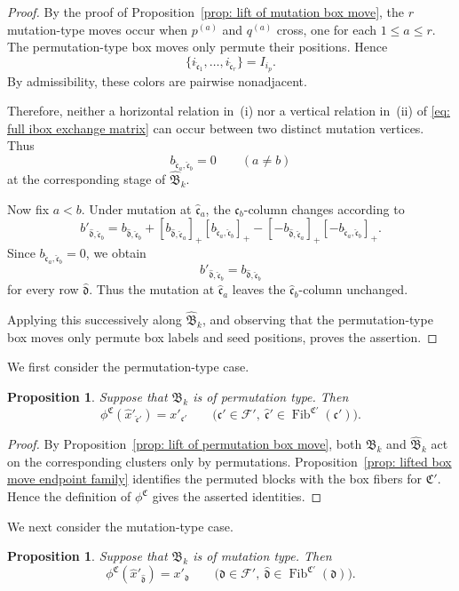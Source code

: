\documentclass[12pt, leqno]{amsart}
\numberwithin{equation}{section}
\theoremstyle{plain}
\newtheorem{proposition}[lemma]{Proposition}
\theoremstyle{definition}
\newcommand{\Fib}{\operatorname{Fib}}
\newcommand{\hx}{\widehat{x}}
\newcommand{\frakB}{\mathfrak{B}}
\newcommand{\frakC}{\mathfrak{C}}
\newcommand{\frakc}{\mathfrak{c}}
\newcommand{\frakd}{\mathfrak{d}}
\newcommand{\hfrakc}{\widehat{\frakc}}
\newcommand{\hfrakd}{\widehat{\frakd}}
\newcommand{\calF}{\mathcal{F}}
\newcommand{\hfrakB}{\widehat{\frakB}}
\begin{document}
\begin{proof}
By the proof of Proposition~\ref{prop: lift of mutation box move},
the $r$ mutation-type moves occur when $p^{(a)}$ and $q^{(a)}$
cross, one for each $1\leq a\leq r$. The permutation-type box moves
only permute their positions. Hence
\[
\{i_{\hfrakc_1},\ldots,i_{\hfrakc_r}\}=I_{i_p}.
\]
By admissibility, these colors are pairwise nonadjacent.

Therefore, neither a horizontal relation in~{\rm (i)} nor a vertical
relation in~{\rm (ii)} of
\eqref{eq: full ibox exchange matrix} can occur between two distinct
mutation vertices. Thus
\[
b_{\hfrakc_a,\hfrakc_b}=0 \qquad(a\ne b)
\]
 at the corresponding stage of $\hfrakB_k$.

Now fix $a<b$. Under mutation at $\hfrakc_a$, the
$\hfrakc_b$-column changes according to
\[
b'_{\hfrakd,\hfrakc_b}
= b_{\hfrakd,\hfrakc_b} + [b_{\hfrakd,\hfrakc_a}]_+ [b_{\hfrakc_a,\hfrakc_b}]_+ - [-b_{\hfrakd,\hfrakc_a}]_+ [-b_{\hfrakc_a,\hfrakc_b}]_+.
\]
Since $b_{\hfrakc_a,\hfrakc_b}=0$,
we obtain
\[
b'_{\hfrakd,\hfrakc_b} = b_{\hfrakd,\hfrakc_b}
\]
for every row $\hfrakd$. Thus the mutation at $\hfrakc_a$ leaves the
$\hfrakc_b$-column unchanged.

Applying this successively along $\hfrakB_k$, and observing that the
permutation-type box moves only permute box labels and
seed positions, proves the assertion.
\end{proof}

We first consider the permutation-type case.

\begin{proposition}\label{prop: permutation ibox cluster folding}
Suppose that $\frakB_k$ is of permutation type. Then
\[
\phi^\frakC(\hx'_{\hfrakc'}) = x'_{\frakc'}
\qquad
\bigl( \frakc'\in\calF',\ \hfrakc'\in\Fib^{\frakC'}(\frakc') \bigr).
\]
\end{proposition}

\begin{proof}
By Proposition~\ref{prop: lift of permutation box move}, both
$\frakB_k$ and $\hfrakB_k$ act on the corresponding clusters only by
permutations. Proposition~\ref{prop: lifted box move endpoint family}
 identifies the permuted blocks with the box fibers for $\frakC'$.
 Hence the definition of $\phi^\frakC$ gives the asserted identities.{}
\end{proof}

We next consider the mutation-type case.

\begin{proposition}\label{prop: mutation ibox cluster folding}
Suppose that $\frakB_k$ is of mutation type. Then
\[
\phi^\frakC(\hx'_{\hfrakd}) =  x'_{\frakd}
\qquad
\bigl( \frakd\in\calF',\ \hfrakd\in\Fib^{\frakC'}(\frakd) \bigr).
\]
\end{proposition}
\end{document}
